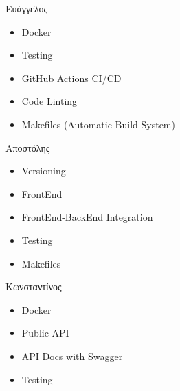 \documentclass[xcolor=dvipsnames]{beamer}
\begin{document}
    \begin{frame}
        Ευάγγελος
        \begin{itemize}
            \item Docker
            \item Testing
            \item GitHub Actions CI/CD
            \item Code Linting
            \item Makefiles (Automatic Build System)
        \end{itemize}
        Αποστόλης
        \begin{itemize}
            \item Versioning
            \item FrontEnd
            \item FrontEnd-BackEnd Integration
            \item Testing 
            \item Makefiles
        \end{itemize}
        Κωνσταντίνος
        \begin{itemize}
            \item Docker
            \item Public API
            \item API Docs with Swagger
            \item Testing
        \end{itemize} 
    \end{frame}
\end{document}
